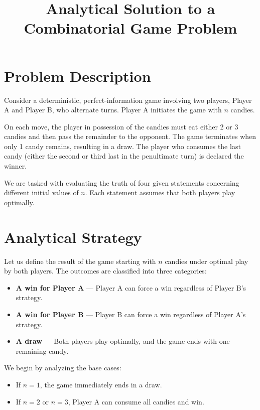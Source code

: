 \documentclass[12pt]{article}
\title{Analytical Solution to a Combinatorial Game Problem}
\author{}
\date{}
\begin{document}
\maketitle

\section{Problem Description}

Consider a deterministic, perfect-information game involving two players, Player A and Player B, who alternate turns. Player A initiates the game with $n$ candies.

On each move, the player in possession of the candies must eat either 2 or 3 candies and then pass the remainder to the opponent. The game terminates when only 1 candy remains, resulting in a draw. The player who consumes the last candy (either the second or third last in the penultimate turn) is declared the winner.

We are tasked with evaluating the truth of four given statements concerning different initial values of $n$. Each statement assumes that both players play optimally.

\section{Analytical Strategy}

Let us define the result of the game starting with $n$ candies under optimal play by both players. The outcomes are classified into three categories:

\begin{itemize}
    \item \textbf{A win for Player A} — Player A can force a win regardless of Player B’s strategy.
    \item \textbf{A win for Player B} — Player B can force a win regardless of Player A’s strategy.
    \item \textbf{A draw} — Both players play optimally, and the game ends with one remaining candy.
\end{itemize}

We begin by analyzing the base cases:
\begin{itemize}
    \item If $n = 1$, the game immediately ends in a draw.
    \item If $n = 2$ or $n = 3$, Player A can consume all candies and win.
\end{itemize}
\end{document}
